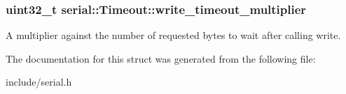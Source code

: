 \subsubsection[{\texorpdfstring{write\+\_\+timeout\+\_\+multiplier}{write_timeout_multiplier}}]{\setlength{\rightskip}{0pt plus 5cm}uint32\+\_\+t serial\+::\+Timeout\+::write\+\_\+timeout\+\_\+multiplier}\hypertarget{structserial_1_1_timeout_a31ddae32907cff9c3d27fa763981317d}{}\label{structserial_1_1_timeout_a31ddae32907cff9c3d27fa763981317d}
A multiplier against the number of requested bytes to wait after calling write. 

The documentation for this struct was generated from the following file\+:\begin{DoxyCompactItemize}
\item 
include/serial.\+h\end{DoxyCompactItemize}
